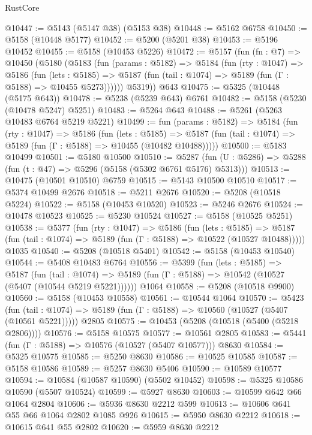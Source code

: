 \begin{lexlean}{RustCore}
\begin{coremodule}
@10447 := @5143 (@5147 @38) (@5153 @38)
@10448 := @5162 @6758
@10450 := @5158 (@10448 @5177)
@10452 := @5200 (@5201 @38)
@10453 := @5196 @10452
@10455 := @5158 (@10453 @5226)
@10472 := @5157
    (fun (fn : @7) =>
    @10450
      (@5180
        (@5183
          (fun (params : @5182) =>
          @5184
            (fun (rty : @1047) =>
            @5186
              (fun (lets : @5185) =>
              @5187 (fun (tail : @1074) => @5189 (fun (Γ : @5188) => @10455 @5273))))))
        @5319))
    @643
@10475 := @5325 (@10448 (@5175 @643))
@10478 := @5238 (@5239 @643) @6761
@10482 := @5158 (@5230 (@10478 @5247) @5251)
@10483 := @5264 @643
@10488 := @5261 (@5263 @10483 @6764 @5219 @5221)
@10499 := fun (params : @5182) =>
  @5184
    (fun (rty : @1047) =>
    @5186
      (fun (lets : @5185) =>
      @5187 (fun (tail : @1074) => @5189 (fun (Γ : @5188) => @10455 (@10482 @10488)))))
@10500 := @5183 @10499
@10501 := @5180 @10500
@10510 := @5287
    (fun (U : @5286) => @5288 (fun (t : @47) => @5296 (@5158 (@5302 @6761 @5176) @5313)))
@10513 := @10475 (@10501 @10510) @6759
@10515 := @5143 @10500 @10510
@10517 := @5374 @10499 @2676
@10518 := @5211 @2676
@10520 := @5208 (@10518 @5224)
@10522 := @5158 (@10453 @10520)
@10523 := @5246 @2676
@10524 := @10478 @10523
@10525 := @5230 @10524
@10527 := @5158 (@10525 @5251)
@10538 := @5377
    (fun (rty : @1047) =>
    @5186
      (fun (lets : @5185) =>
      @5187 (fun (tail : @1074) => @5189 (fun (Γ : @5188) => @10522 (@10527 @10488)))))
    @1035
@10540 := @5208 (@10518 @5401)
@10542 := @5158 (@10453 @10540)
@10544 := @5408 @10483 @6764
@10556 := @5399
    (fun (lets : @5185) =>
    @5187
      (fun (tail : @1074) =>
      @5189 (fun (Γ : @5188) => @10542 (@10527 (@5407 (@10544 @5219 @5221))))))
    @1064
@10558 := @5208 (@10518 @9900)
@10560 := @5158 (@10453 @10558)
@10561 := @10544 @1064
@10570 := @5423
    (fun (tail : @1074) => @5189 (fun (Γ : @5188) => @10560 (@10527 (@5407 (@10561 @5221)))))
    @2805
@10575 := @10453 (@5208 (@10518 (@5400 (@5218 @2806))))
@10576 := @5158 @10575
@10577 := @10561 @2805
@10583 := @5441 (fun (Γ : @5188) => @10576 (@10527 (@5407 @10577))) @8630
@10584 := @5325 @10575
@10585 := @5250 @8630
@10586 := @10525 @10585
@10587 := @5158 @10586
@10589 := @5257 @8630 @5406
@10590 := @10589 @10577
@10594 := @10584 (@10587 @10590) (@5502 @10452)
@10598 := @5325 @10586 @10590 (@5507 @10524)
@10599 := @5927 @8630
@10603 := @10599 @642 @66 @1064 @2804
@10606 := @5936 @8630 @2212 @599
@10613 := @10606 @641 @55 @66 @1064 @2802 @1085 @926
@10615 := @5950 @8630 @2212
@10618 := @10615 @641 @55 @2802
@10620 := @5959 @8630 @2212

\end{coremodule}
\end{lexlean}
